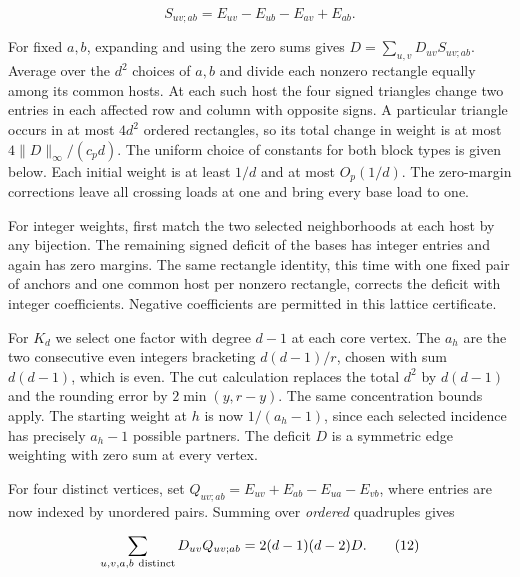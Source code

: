 \documentclass[english,11pt,a4paper]{article}
\begin{document}
\[S_{uv;ab}=E_{uv}-E_{ub}-E_{av}+E_{ab}.\]

For fixed \(a,b\), expanding and using the zero sums gives \(D=\sum_{u,v}D_{uv}S_{uv;ab}\). Average over the \(d^2\) choices of \(a,b\) and divide each nonzero rectangle equally among its common hosts. At each such host the four signed triangles change two entries in each affected row and column with opposite signs. A particular triangle occurs in at most \(4d^2\) ordered rectangles, so its total change in weight is at most \(4\|D\|_\infty/(c_pd)\). The uniform choice of constants for both block types is given below. Each initial weight is at least \(1/d\) and at most \(O_p(1/d)\). The zero-margin corrections leave all crossing loads at one and bring every base load to one.

For integer weights, first match the two selected neighborhoods at each host by any bijection. The remaining signed deficit of the bases has integer entries and again has zero margins. The same rectangle identity, this time with one fixed pair of anchors and one common host per nonzero rectangle, corrects the deficit with integer coefficients. Negative coefficients are permitted in this lattice certificate.

For \(K_d\) we select one factor with degree \(d-1\) at each core vertex. The \(a_h\) are the two consecutive even integers bracketing \(d(d-1)/r\), chosen with sum \(d(d-1)\), which is even. The cut calculation replaces the total \(d^2\) by \(d(d-1)\) and the rounding error by \(2\min(y,r-y)\). The same concentration bounds apply. The starting weight at \(h\) is now \(1/(a_h-1)\), since each selected incidence has precisely \(a_h-1\) possible partners. The deficit \(D\) is a symmetric edge weighting with zero sum at every vertex.

For four distinct vertices, set \(Q_{uv;ab}=E_{uv}+E_{ab}-E_{ua}-E_{vb}\), where entries are now indexed by unordered pairs. Summing over \emph{ordered} quadruples gives

\[\sum_{u,v,a,b\ {\rm distinct}}D_{uv}Q_{uv;ab}
       =2(d-1)(d-2)D.
\tag{12}\]
\end{document}
